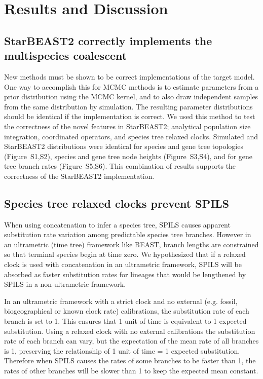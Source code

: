 \documentclass[12pt]{article}
\begin{document}
\section{Results and Discussion}

\subsection{StarBEAST2 correctly implements the multispecies coalescent}

New methods must be shown to be correct implementations of the target model.
One way to accomplish this for MCMC methods is to estimate parameters from a
prior distribution using the MCMC kernel, and to also draw independent samples
from the same distribution by simulation. The resulting parameter
distributions should be identical if the implementation is correct. We used
this method to test the correctness of the novel features in StarBEAST2;
analytical population size integration, coordinated operators, and species
tree relaxed clocks. Simulated and StarBEAST2 distributions were identical for
species and gene tree topologies (Figure~S1,S2), species and gene tree node
heights (Figure~S3,S4), and for gene tree branch rates (Figure~S5,S6). This
combination of results supports the correctness of the StarBEAST2
implementation.

\subsection{Species tree relaxed clocks prevent SPILS}

When using concatenation to infer a species tree, SPILS causes apparent
substitution rate variation among predictable species tree branches. However
in an ultrametric (time tree) framework like BEAST, branch lengths are
constrained so that terminal species begin at time zero. We hypothesized that
if a relaxed clock is used with concatenation in an ultrametric framework,
SPILS will be absorbed as faster substitution rates for lineages that would be
lengthened by SPILS in a non-ultrametric framework.

In an ultrametric framework with a strict clock and no external (e.g. fossil,
biogeographical or known clock rate) calibrations, the substitution rate of
each branch is set to 1. This ensures that 1 unit of time is equivalent to 1
expected substitution. Using a relaxed clock with no external calibrations the
substitution rate of each branch can vary, but the expectation of the mean
rate of all branches is 1, preserving the relationship of 1 unit of time = 1
expected substitution. Therefore when SPILS causes the rates of some branches
to be faster than 1, the rates of other branches will be slower than 1 to keep
the expected mean constant.
\end{document}
